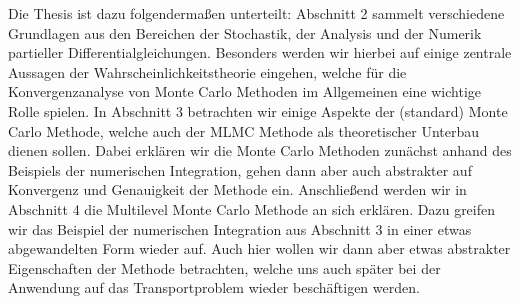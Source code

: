 Die Thesis ist dazu folgendermaßen unterteilt:\newline 
Abschnitt 2 sammelt verschiedene Grundlagen aus den Bereichen der Stochastik, der Analysis und der Numerik partieller Differentialgleichungen. Besonders werden wir hierbei auf einige zentrale Aussagen der Wahrscheinlichkeitstheorie eingehen, welche für die Konvergenzanalyse von Monte Carlo Methoden im Allgemeinen eine wichtige Rolle spielen. \newline
In Abschnitt 3 betrachten wir einige Aspekte der (standard) Monte Carlo Methode, welche auch der MLMC Methode als theoretischer Unterbau dienen sollen. Dabei erklären wir die Monte Carlo Methoden zunächst anhand des Beispiels der numerischen Integration, gehen dann aber auch abstrakter auf Konvergenz und Genauigkeit der Methode ein.\newline
Anschließend werden wir in Abschnitt 4 die Multilevel Monte Carlo Methode an sich erklären.
Dazu greifen wir das Beispiel der numerischen Integration aus Abschnitt 3 in einer etwas abgewandelten Form wieder auf. Auch hier wollen wir dann aber etwas abstrakter Eigenschaften der Methode betrachten, welche uns auch später bei der Anwendung auf das Transportproblem wieder beschäftigen werden. \newline
